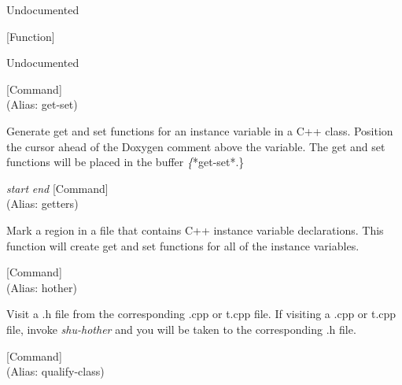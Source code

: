 \begin{doc-string}
Undocumented
\end{doc-string}

\vspace{1em}
\noindent
{}
\usebox{\funcname}
 \hfill [Function]

\begin{doc-string}
Undocumented
\end{doc-string}

\vspace{1em}
\noindent
{}
\usebox{\funcname}
 \hfill [Command]\\%
 (Alias: get-set)

\begin{doc-string}
Generate get and set functions for an instance variable in a C++ class.
Position the cursor ahead of the Doxygen comment above the variable.  The get
and set functions will be placed in the buffer \emph\{*get-set*.\}
\end{doc-string}

\vspace{1em}
\noindent
{}
\usebox{\funcname}\emph{start} \emph{end}
 \hfill [Command]\\%
 (Alias: getters)

\begin{doc-string}
Mark a region in a file that contains C++ instance variable declarations.
This function will create get and set functions for all of the instance
variables.
\end{doc-string}

\vspace{1em}
\noindent
{}
\usebox{\funcname}
 \hfill [Command]\\%
 (Alias: hother)

\begin{doc-string}
Visit a .h file from the corresponding .cpp or t.cpp file.  If visiting a .cpp or
t.cpp file, invoke \emph{shu-hother} and you will be taken to the corresponding .h file.
\end{doc-string}

\vspace{1em}
\noindent
{}
\usebox{\funcname}
 \hfill [Command]\\%
 (Alias: qualify-class)

